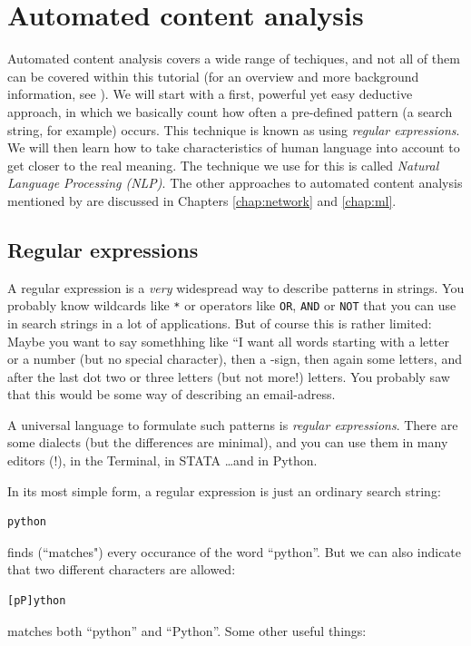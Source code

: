 \documentclass[a4paper,12pt]{book}
\begin{document}
\chapter{Automated content analysis}
Automated content analysis covers a wide range of techiques, and not all of them can be covered within this tutorial (for an overview and more background information, see \cite{Boumans2016}). We will start with a first, powerful yet easy deductive approach, in which we basically count how often a pre-defined pattern (a search string, for example) occurs. This technique is known as using \emph{regular expressions}. We will then learn how to take characteristics of human language into account to get closer to the real meaning. The technique we use for this is called \emph{Natural Language Processing (NLP)}.
The other approaches to automated content analysis mentioned by \cite{Boumans2016} are discussed in Chapters \ref{chap:network} and \ref{chap:ml}.


\section{Regular expressions}

A regular expression is a \emph{very} widespread way to describe patterns in strings. You probably know wildcards like {\tt{*}} or operators like {\tt{OR}}, {\tt{AND}} or {\tt{NOT}} that you can use in search strings in a lot of applications. But of course this is rather limited: Maybe you want to say somethhing like ``I want all words starting with a letter or a number (but no special character), then a \@-sign, then again some letters, and after the last dot two or three letters (but not more!) letters. You probably saw that this would be some way of describing an email-adress. 

A universal language to formulate such patterns is \emph{regular expressions}. There are some dialects (but the differences are minimal), and you can use them in many editors (!), in the Terminal, in STATA \ldots and in Python.

In its most simple form, a regular expression is just an ordinary search string:
\begin{lstlisting}
python
\end{lstlisting}
finds (``matches") every occurance of the word ``python''. But we can also indicate that two different characters are allowed:
\begin{lstlisting}
[pP]ython
\end{lstlisting}
matches both ``python'' and ``Python''. Some other useful things:
\end{document}
